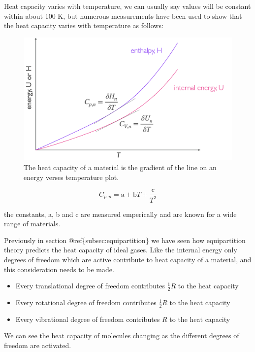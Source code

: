 \documentclass[
]{book}
\begin{document}
Heat capacity varies with temperature, we can usually say values will be constant within about 100 K, but numerous measurements have been used to show that the heat capacity varies with temperature as follows:

\begin{figure}

{\centering \includegraphics[width=0.7\linewidth]{images/heatcapacitypV} 

}

\caption{The heat capacity of a material is the gradient of the line on an energy verses temperature plot.}\label{fig:heatcapacitypV}
\end{figure}

\begin{equation}
C_{p,n}=\textrm{a}+\textrm{b}T+\frac{\textrm{c}}{T^2}
\label{eq:heatcapacitytemp}
\end{equation}

the constants, a, b and c are measured emperically and are known for a wide range of materials.

Previously in section @ref\{subsec:equipartition\} we have seen how equipartition theory predicts the heat capacity of ideal gases. Like the internal energy only degrees of freedom which are active contribute to heat capacity of a material, and this consideration needs to be made.

\begin{itemize}
\item
  Every translational degree of freedom contributes \(\frac{1}{2}R\) to the heat capacity
\item
  Every rotational degree of freedom contributes \(\frac{1}{2}R\) to the heat capacity
\item
  Every vibrational degree of freedom contributes \(R\) to the heat capacity
\end{itemize}

We can see the heat capacity of molecules changing as the different degrees of freedom are activated.
\end{document}
